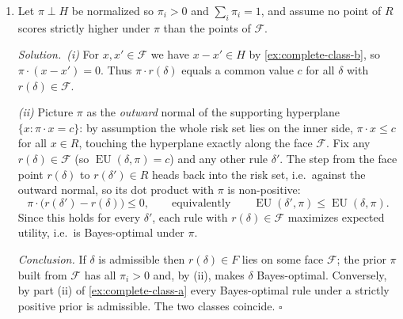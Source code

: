 \documentclass[11pt]{article}
\newcommand{\rd}{r(\delta)}
\DeclareMathOperator{\EU}{EU}
\newcommand{\soln}{\medskip\noindent\textit{Solution.}\ }
\renewcommand{\qed}{\ensuremath{\square}}
\begin{document}
\begin{solution}
\begin{enumerate}
\item Let $\pi\perp H$ be normalized so $\pi_i>0$ and $\sum_i\pi_i=1$, and assume no point of $R$ scores strictly higher under $\pi$ than the points of $\mathcal F$.

\soln \emph{(i)} For $x,x'\in\mathcal F$ we have $x-x'\in H$ by \cref{ex:complete-class-b}, so $\pi\cdot(x-x')=0$. Thus $\pi\cdot\rd$ equals a common value $c$ for all $\delta$ with $\rd\in\mathcal F$.

\emph{(ii)} Picture $\pi$ as the \emph{outward} normal of the supporting hyperplane $\{x:\pi\cdot x=c\}$: by assumption the whole risk set lies on the inner side, $\pi\cdot x\le c$ for all $x\in R$, touching the hyperplane exactly along the face $\mathcal F$. Fix any $\rd\in\mathcal F$ (so $\EU(\delta,\pi)=c$) and any other rule $\delta'$. The step from the face point $\rd$ to $r(\delta')\in R$ heads back into the risk set, i.e.\ against the outward normal, so its dot product with $\pi$ is non-positive:
\[
  \pi\cdot\big(r(\delta')-\rd\big)\le 0,\qquad\text{equivalently}\qquad \EU(\delta',\pi)\le\EU(\delta,\pi).
\]
Since this holds for every $\delta'$, each rule with $\rd\in\mathcal F$ maximizes expected utility, i.e.\ is Bayes-optimal under $\pi$.

\emph{Conclusion.} If $\delta$ is admissible then $\rd\in F$ lies on some face $\mathcal F$; the prior $\pi$ built from $\mathcal F$ has all $\pi_i>0$ and, by (ii), makes $\delta$ Bayes-optimal. Conversely, by part (ii) of \cref{ex:complete-class-a} every Bayes-optimal rule under a strictly positive prior is admissible. The two classes coincide. \qed
\end{enumerate}
\end{solution}
\end{document}
